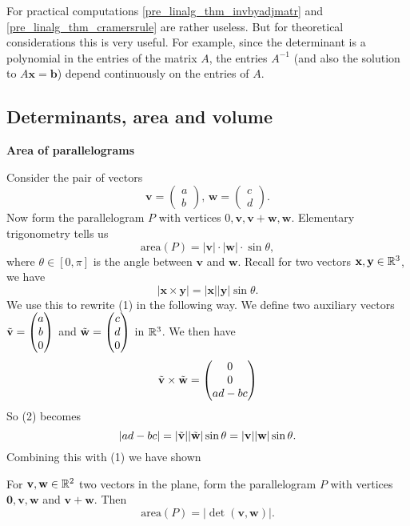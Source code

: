 \documentclass[10pt, a4paper]{article}
\newcommand{\mbf}[1]{\mathbf{#1}}
\begin{document}
\begin{remark}
    For practical computations \autoref{pre_linalg_thm_invbyadjmatr} and \autoref{pre_linalg_thm_cramersrule} are rather useless.
    But for theoretical considerations this is very useful.
    For example,
    since the determinant is a polynomial in the entries of the matrix $A$,
    the entries $A ^ {-1}$
    (and also the solution to $A\mbf{x} = \mbf{b}$)
    depend continuously on the entries of $A$.
\end{remark}

\subsection{Determinants, area and volume}

\textbf{Area of parallelograms}

Consider the pair of vectors
\[
\mbf{v} = \begin{pmatrix} a \\ b \end{pmatrix},
\,\mbf{w} = \begin{pmatrix} c \\ d \end{pmatrix}.
\]
Now form the parallelogram $P$ with vertices $0, \mbf{v}, \mbf{v + w}, \mbf{w}$.
Elementary trigonometry tells us
\begin{equation}
    \mathrm{area}(P) = |\mbf{v}| \cdot |\mbf{w}| \cdot \sin\theta,
\end{equation}
where $\theta \in [0, \pi]$ is the angle between $\mbf{v}$ and $\mbf{w}$.
Recall for two vectors $\mbf{x, y} \in \R ^ 3$,
we have
\begin{equation}
    |\mbf{x \times y}| = |\mbf{x}||\mbf{y}|\sin\theta.
\end{equation}
We use this to rewrite (1) in the following way.
We define two auxiliary vectors $\Tilde{\mbf{v}} = \begin{pmatrix}
    a \\ b \\ 0
\end{pmatrix}$ and $\Tilde{\mbf{w}} = \begin{pmatrix}
    c \\ d \\ 0
\end{pmatrix}$ in $\mathbb{R} ^ 3$.
We then have
\[
\Tilde{\mbf{v}} \times \Tilde{\mbf{w}} = \begin{pmatrix}
    0 \\ 0 \\ ad - bc
\end{pmatrix}
\]
So (2) becomes
\[
|ad - bc| = |\Tilde{\mbf{v}}||\Tilde{\mbf{w}}|\sin\theta = |\mbf{v}||\mbf{w}|\sin\theta.
\]
Combining this with (1) we have shown
\begin{theorem}
    For $\mbf{v, w} \in \R ^ 2$ two vectors in the plane,
    form the parallelogram $P$ with vertices $\mbf{0, v, w}$ and $\mbf{v + w}$.
    Then
    \[
    \mathrm{area}(P) = |\det(\mbf{v, w})|.
    \]
\end{theorem}
\end{document}
